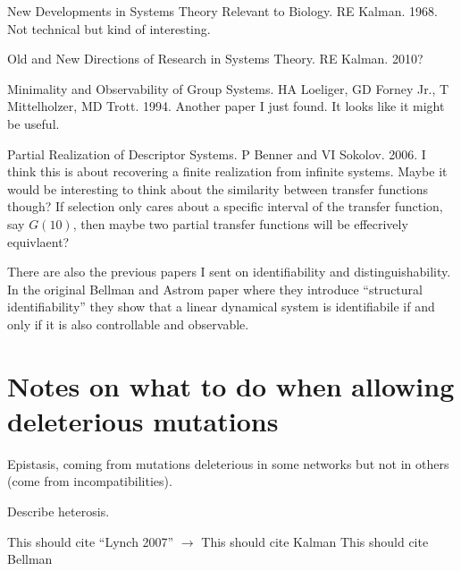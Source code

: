 \documentclass[11 pt]{article}
\begin{document}
New Developments in Systems Theory Relevant to Biology. RE Kalman. 1968.
Not technical but kind of interesting. 

Old and New Directions of Research in Systems Theory. RE Kalman. 2010?

Minimality and Observability of Group Systems. HA Loeliger, GD Forney Jr., T Mittelholzer, MD Trott. 1994. 
Another paper I just found. It looks like it might be useful.

Partial Realization of Descriptor Systems. P Benner and VI Sokolov. 2006. 
I think this is about recovering a finite realization from infinite systems. Maybe it would be interesting to think about the similarity between transfer functions though? If selection only cares about a specific interval of the transfer function, say $G(10)$, then maybe two partial transfer functions will be effecrively equivlaent? 

There are also the previous papers I sent on identifiability and distinguishability. In the original Bellman and Astrom paper where they introduce ``structural identifiability'' they show that a linear dynamical system is identifiabile if and only if it is also controllable and observable. 


\section{Notes on what to do when allowing deleterious mutations}

Epistasis, coming from mutations deleterious in some networks but not in others
(come from incompatibilities).

Describe heterosis.


This should cite ``Lynch 2007'' $\rightarrow$ \cite{lynch07a}
This should cite Kalman \cite{kalman63}
This should cite Bellman \cite{bellman}


	
\end{document}
